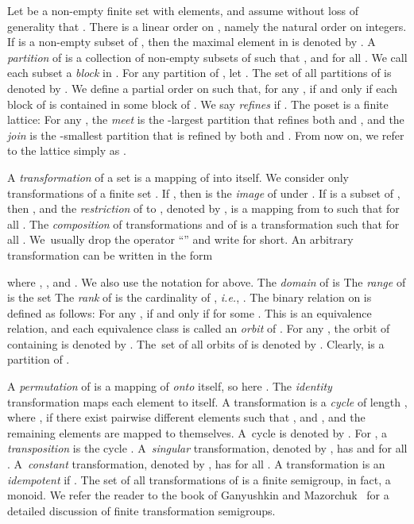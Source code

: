 \documentclass{llncs}
\newcommand{\ie}{\mbox{\it i.e.}}
\begin{document}
Let  be a non-empty finite set with  elements, and assume without loss of generality that . There is a linear order on , namely the natural order  on integers. If  is a non-empty subset of , then the maximal element in  is denoted by . A \emph{partition}  of  is a collection  of non-empty subsets of  such that  , and
 for all .
We call each subset  a \emph{block} in . For any partition  of , let . The set of all partitions of  is denoted by . We define a partial order  on  such that, for any ,  if and only if each block of  is contained in some block of . We say  \emph{refines}  if . 
The poset  is a finite lattice: For any , the \emph{meet}  is the -largest partition that refines both  and , and the \emph{join}  is the -smallest partition that is refined by both  and . From now on, we refer to the lattice  simply  as . 


A {\em transformation} of a set  is a mapping of  into itself. We consider only transformations  of a finite set . If  , then  is the {\it image} of  under .  If  is a subset of , then , and the {\em restriction} of  to , denoted by , is a mapping from  to  such that  for all . The {\em composition} of  transformations  and  of  is a transformation  such that  for all . We~usually drop the  operator ``'' and write  for short. 
An arbitrary transformation can be written in the form

where ,  , and . We also use the notation  for  above. The {\em domain}  of  is 
The {\em range}  of  is the set  The \emph{rank}  of  is the cardinality of , \ie, . The binary relation  on  is defined as follows: For any ,  if and only if  for some . This is an equivalence relation, and each equivalence class is called an \emph{orbit} of . For any , the orbit of  containing  is denoted by . The~set of all orbits of  is denoted by . Clearly,  is a partition of . 

A \emph{permutation} of  is a mapping of  \emph{onto} itself, so here . 
The \emph{identity} transformation  maps each element to itself. 
A transformation  is a \emph{cycle} of length , where , if there exist pairwise different elements  such that
, and , and the remaining elements are mapped to themselves.
A~cycle is denoted by .
For , a \emph{transposition} is the cycle .
A~\emph{singular} transformation, denoted by , has  and  for all .
A~\emph{constant} transformation,  denoted by , has  for all .
A transformation   is an \emph{idempotent} if .
The set  of all transformations of  is a finite semigroup, in fact, a monoid. We refer the reader to the book of Ganyushkin and Mazorchuk~\cite{GaMa09} for a detailed discussion of finite transformation semigroups. 
\end{document}
